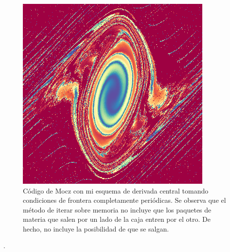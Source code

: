 \documentclass[notitlepage,letterpaper,12pt]{article} %
\begin{document}
\begin{figure}[h]
   \includegraphics[scale= 0.6]{snap90.png}
  \caption{Código de Mocz con mi esquema de derivada central tomando condiciones de frontera completamente periódicas. Se observa que el método de iterar sobre memoria no incluye que los paquetes de materia que salen por un lado de la caja entren por el otro. De hecho, no incluye la posibilidad de que se salgan.}
\end{figure}	


	










                      





.
\end{document}

